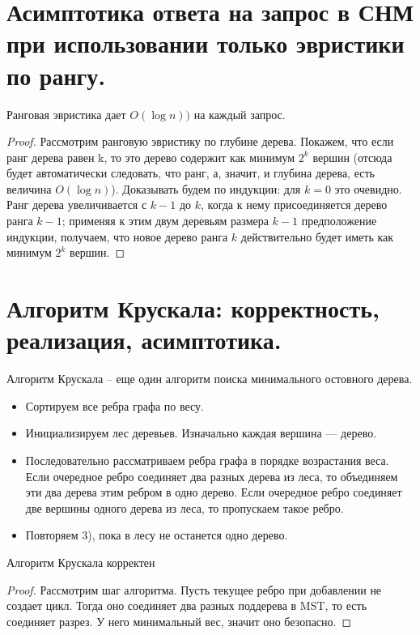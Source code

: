 \setcounter{section}{60}
\section{Асимптотика ответа на запрос в СНМ при использовании только эвристики по рангу.}

\begin{theorem}
Ранговая эвристика дает $O(\log n))$ на каждый запрос.
\end{theorem} 

\begin{proof}
    Рассмотрим ранговую эвристику по глубине дерева. Покажем, что если ранг дерева равен k, то это дерево содержит как минимум $2^k$ вершин (отсюда будет автоматически следовать, что ранг, а, значит, и глубина дерева, есть величина $O(\log n)$). Доказывать будем по индукции: для $k=0$ это очевидно. Ранг дерева увеличивается с $k-1$ до $k$, когда к нему присоединяется дерево ранга $k-1$; применяя к этим двум деревьям размера $k-1$ предположение индукции, получаем, что новое дерево ранга $k$ действительно будет иметь как минимум $2^k$ вершин. 
\end{proof}

\setcounter{section}{61}
\section{Алгоритм Крускала: корректность, реализация, асимптотика.}

Алгоритм Крускала – еще один алгоритм поиска минимального остовного дерева.

\begin{itemize}
    \item Сортируем все ребра графа по весу.
    \item Инициализируем лес деревьев. Изначально каждая вершина --- дерево.
    \item Последовательно рассматриваем ребра графа в порядке возрастания веса. Если очередное ребро соединяет два разных дерева из леса, то объединяем эти два дерева этим ребром в одно дерево. Если очередное ребро соединяет две вершины одного дерева из леса, то пропускаем такое ребро.
    \item Повторяем 3), пока в лесу не останется одно дерево.
\end{itemize}

\begin{theorem}
Алгоритм Крускала корректен
\end{theorem}

\begin{proof}
Рассмотрим шаг алгоритма. Пусть текущее ребро при добавлении не создает цикл. Тогда оно соединяет два разных поддерева в MST, то есть соединяет разрез. У него минимальный вес, значит оно безопасно.
\end{proof}

